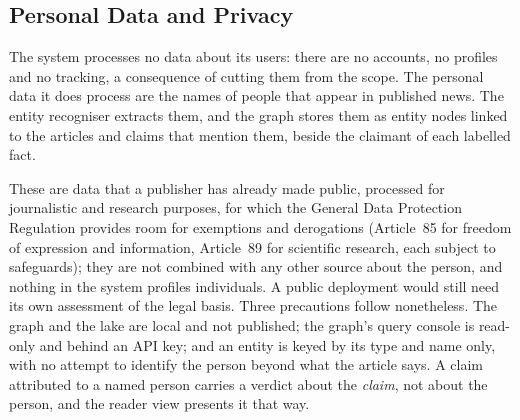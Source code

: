 
\subsection{Personal Data and Privacy}

The system processes no data about its users: there are no accounts,
no profiles and no tracking, a consequence of cutting them from the
scope. The personal data it does process are the names of people that
appear in published news. The entity recogniser extracts them, and the
graph stores them as entity nodes linked to the articles and claims
that mention them, beside the claimant of each labelled fact.

These are data that a publisher has already made public, processed
for journalistic and research purposes, for which the General Data
Protection Regulation provides room for exemptions and derogations
(Article~85 for freedom of expression and information, Article~89 for
scientific research, each subject to safeguards); they are not combined
with any other source about the person, and nothing in the system
profiles individuals. A public deployment would still need its own
assessment of the legal basis. Three precautions follow nonetheless. The
graph and the lake are local and not published; the graph's query
console is read-only and behind an API key; and an entity is keyed by
its type and name only, with no attempt to identify the person beyond
what the article says. A claim attributed to a named person carries a
verdict about the \emph{claim}, not about the person, and the reader
view presents it that way.
